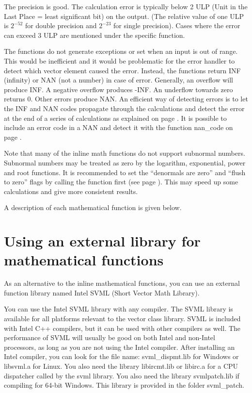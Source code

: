 \documentclass[vcl_manual.tex]{subfiles}
\begin{document}
The precision is good. The calculation error is typically below 2 ULP (Unit in the Last Place = least significant bit) on the output. (The relative value of one ULP is $2^{-52}$ for double precision and $2^{-23}$ for single precision). Cases where the error can exceed 3 ULP are mentioned under the specific function.

The functions do not generate exceptions or set  when an input is out of range. This would be inefficient and it would be problematic for the error handler to detect which vector element caused the error. Instead, the functions return INF (infinity) or NAN (not a number) in case of error. Generally, an overflow will produce INF. A negative overflow produces -INF. An underflow towards zero returns 0. Other errors produce NAN. An efficient way of detecting errors is to let the INF and NAN codes propagate through the calculations and detect the error at the end of a series of calculations as explained on page \pageref{FloatingPointErrors}. It is possible to include an error code in a NAN and detect it with the function nan\_code on page \pageref{nanCode}.

Note that many of the inline math functions do not support subnormal numbers. Subnormal numbers may be treated as zero by the logarithm, exponential, power and root functions. It is recommended to set the “denormals are zero” and “flush to zero” flags by calling the function  first (see page \pageref{noSubnormals}). This may speed up some calculations and give more consistent results.

A description of each mathematical function is given below.


\section{Using an external library for mathematical functions}\label{ExternalMathLibrary}

As an alternative to the inline mathematical functions, you can use an external function library named Intel SVML (Short Vector Math Library).

You can use the Intel SVML library with any compiler. The SVML library is available for all platforms relevant to the vector class library. SVML is included with Intel C++ compilers, but it can be used with other compilers as well.
The performance of SVML will usually be good on both Intel and non-Intel processors, as long as you are not using the Intel compiler.
After installing an Intel compiler, you can look for the file name: svml\_dispmt.lib for Windows or libsvml.a for Linux. You also need the library libircmt.lib or libirc.a for a CPU dispatcher called by the svml library.
You also need the library svmlpatch.lib if compiling for 64-bit Windows. This library is provided in the folder svml\_patch.
\end{document}
